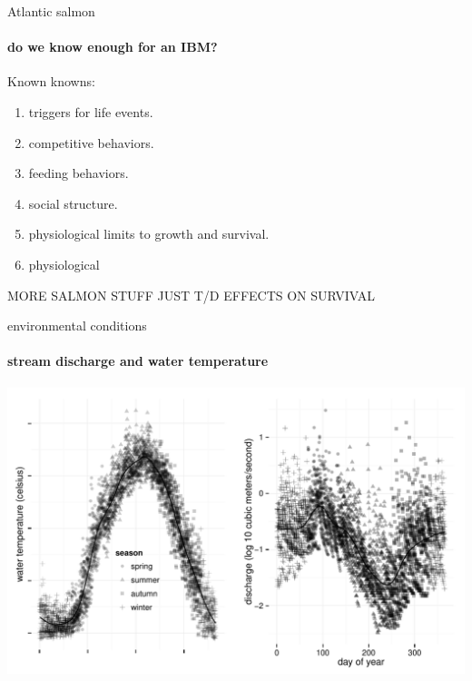 \documentclass[show notes]{beamer}
\begin{document}
\begin{frame}{Atlantic salmon}
	\framesubtitle{do we know enough for an IBM?}
    
    Known knowns:
    \begin{enumerate}
    \item triggers for life events.
    \item competitive behaviors.
    \item feeding behaviors.
    \item social structure.
    \item physiological limits to growth and survival.
    \item physiological 
    \end{enumerate}


\end{frame}

\begin{frame}{MORE SALMON STUFF JUST T/D EFFECTS ON SURVIVAL}
\end{frame}



\begin{frame}{environmental conditions}
  \framesubtitle{stream discharge and water temperature}	
  \includegraphics[clip, trim=0 0 0 0, height=.8\textheight]{pl-environment-wide.pdf}
    
\end{frame}
\end{document}
